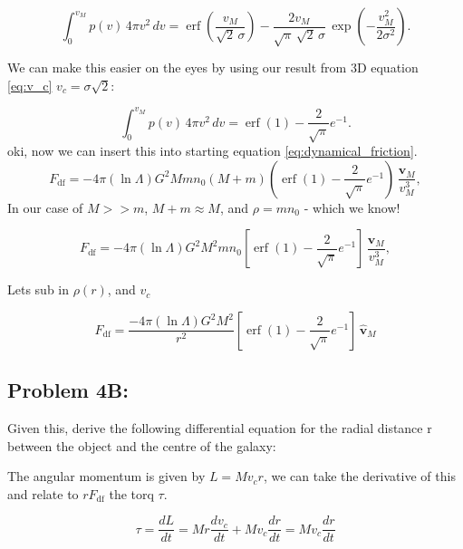 \begin{equation}
    \int_{0}^{v_M} p(v)\,4\pi v^{2}\,dv 
= \operatorname{erf}\!\left(\frac{v_M}{\sqrt{2}\,\sigma}\right) 
- \frac{2v_M}{\sqrt{\pi}\,\sqrt{2}\,\sigma}\,
\exp\!\left(-\frac{v_M^{2}}{2\sigma^{2}}\right).
\end{equation}

We can make this easier on the eyes by using our result from 3D equation \ref{eq:v_c} $v_c = \sigma \sqrt{2}$:

\begin{equation}
    \int_{0}^{v_M} p(v)\,4\pi v^{2}\,dv  = \operatorname{erf}(1) - \frac{2}  {\sqrt{\pi}}e^{-1}.
\end{equation}
oki, now we can insert this into starting equation \ref{eq:dynamical_friction}.
\begin{equation} 
    F_{\mathrm{df}} 
    = -4 \pi (\ln \Lambda) G^2 M m n_0 (M+m) 
    (\operatorname{erf}(1) - \frac{2}  {\sqrt{\pi}}e^{-1}) \, \frac{\mathbf{v}_M}{v_M^3},
\end{equation}
In our case of $M >>m$, $M +m \approx M$, and $\rho = mn_0$ - which we know!

\begin{equation} 
    F_{\mathrm{df}} 
    = -4 \pi (\ln \Lambda) G^2 M^2 m n_0 
    [\operatorname{erf}(1) - \frac{2}  {\sqrt{\pi}}e^{-1}] \, \frac{\mathbf{v}_M}{v_M^3},
\end{equation}

Lets sub in $\rho(r)$, and $v_c$

\begin{equation} 
    \boxed{F_{\mathrm{df}} 
    = \frac{-4 \pi (\ln \Lambda) G^2 M^2 }{r^2} 
    [\operatorname{erf}(1) - \frac{2}  {\sqrt{\pi}}e^{-1}] \, \hat{\mathbf{v}}_M} 
\end{equation}

\subsection*{Problem 4B:}
Given this,
derive the following differential equation for the radial distance r between the object and the centre of
the galaxy:

The angular momentum is given by $L = Mv_cr$, we can take the derivative of this and relate to $rF_{\mathrm{df}}$ the torq $\tau$. 

\begin{equation}
    \tau = \frac{dL}{dt} = Mr \frac{dv_c}{dt} + Mv_c\frac{dr}{dt}  = Mv_c\frac{dr}{dt}
\end{equation}

